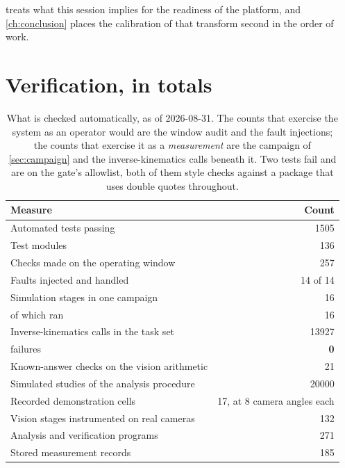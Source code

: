  treats what this session implies for the readiness of the
platform, and \cref{ch:conclusion} places the calibration of that transform
second in the order of work.

\section{Verification, in totals}

\begin{table}[htbp]
  \centering
  \caption[Verification totals]{What is checked automatically, as of
  2026-08-31. The counts that exercise the system as an operator would are
  the window audit and the fault injections; the counts that exercise it as a
  \emph{measurement} are the campaign of \cref{sec:campaign} and the
  inverse-kinematics calls beneath it. Two tests fail and are on the gate's
  allowlist, both of them style checks against a package that uses double
  quotes throughout.}
  \label{tab:verification}
  \begin{tabular}{@{}lr@{}}
    \toprule
    Measure & Count \\
    \midrule
    Automated tests passing & \num{1505} \\
    Test modules & \num{136} \\
    Checks made on the operating window & \num{257} \\
    Faults injected and handled & 14 of 14 \\
    \midrule
    Simulation stages in one campaign & \num{16} \\
    \quad of which ran & \num{16} \\
    Inverse-kinematics calls in the task set & \num{13927} \\
    \quad failures & \textbf{0} \\
    Known-answer checks on the vision arithmetic & \num{21} \\
    Simulated studies of the analysis procedure & \num{20000} \\
    \midrule
    Recorded demonstration cells & 17, at 8 camera angles each \\
    Vision stages instrumented on real cameras & \num{132} \\
    Analysis and verification programs & \num{271} \\
    Stored measurement records & \num{185} \\
    \bottomrule
  \end{tabular}
\end{table}


